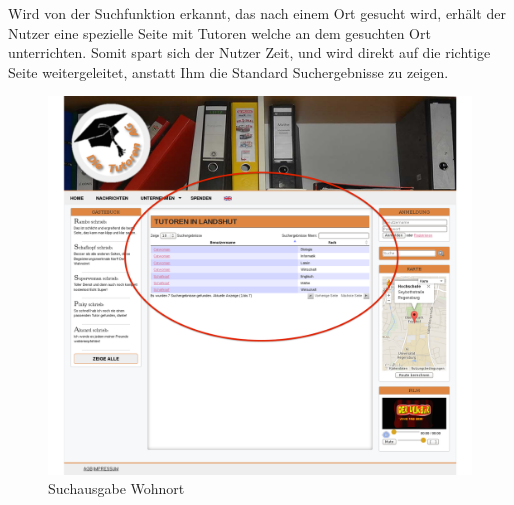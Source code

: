 Wird von der Suchfunktion erkannt, das nach einem Ort gesucht wird, erhält der 
Nutzer eine spezielle Seite mit Tutoren welche an dem gesuchten Ort unterrichten. 
Somit spart sich der Nutzer Zeit, und wird direkt auf die richtige Seite 
weitergeleitet, anstatt Ihm die Standard Suchergebnisse zu zeigen.
\begin{figure}[!htbp]
\centering
\includegraphics[width=1\linewidth]{../Screenshots/de/Suche_Ort}
\caption{Suchausgabe Wohnort}
\label{fig:SuchausgabeWohnort}
\end{figure}
